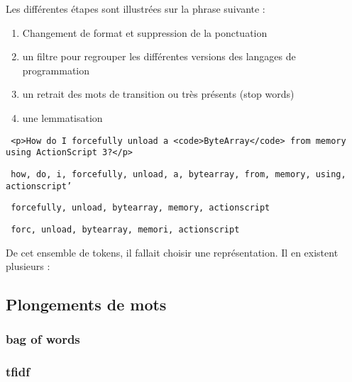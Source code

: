 \documentclass{article}
\begin{document}
Les différentes étapes sont illustrées sur la phrase suivante :
\begin{minipage}{0.4\linewidth}
    \begin{enumerate}
        \item Changement de format et suppression de la ponctuation
        
        \item un filtre pour regrouper les différentes versions des langages de programmation
        \item un retrait des mots de transition ou très présents (stop words)
        \item une lemmatisation
    \end{enumerate}
\end{minipage}
\hfill
\begin{minipage}{0.5\linewidth}
{\small 
\texttt{%
<p>How do I forcefully unload a <code>ByteArray</code> from memory using ActionScript 3?</p>}

\vspace{0.3cm}
\hline
\vspace{0.3cm}

\texttt{%
how, do, i, forcefully, unload, a, bytearray, from, memory, using, actionscript'
}

\vspace{0.4cm}
\hline
\vspace{0.4cm}

\texttt{%
forcefully, unload, bytearray, memory, actionscript
}

\vspace{0.45cm}
\hline
\vspace{0.45cm}

\texttt{%
forc, unload, bytearray, memori, actionscript}
}
\end{minipage}

De cet ensemble de tokens, il fallait choisir une représentation. Il en existent plusieurs :
\subsection{Plongements de mots}
\subsubsection*{bag of words}
\subsubsection*{tfidf}
\end{document}
